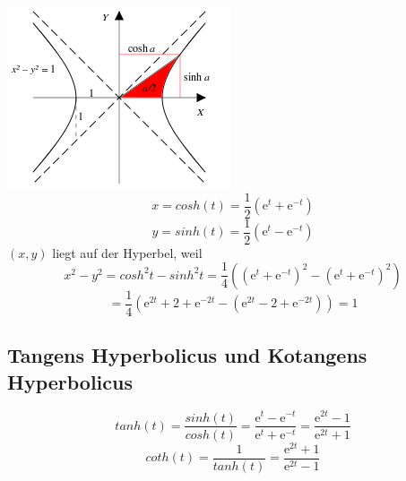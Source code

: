 \documentclass{article}
\begin{document}
\vspace{4ex}

\includegraphics[scale=0.5]{png/cosh.png}
\[ x = cosh(t) = \frac{1}{2}\left(\mathrm{e}^t + \mathrm{e}^{-t}\right) \]
\[ y = sinh(t) = \frac{1}{2}\left(\mathrm{e}^t - \mathrm{e}^{-t}\right) \]
$(x,y)$ liegt auf der Hyperbel, weil
\[ x^2 - y^2 = cosh^2t - sinh^2t = \frac{1}{4} \left(\left(\mathrm{e}^t+\mathrm{e}^{-t}\right)^2 - \left(\mathrm{e}^t+\mathrm{e}^{-t}\right)^2\right) \]
\[ = \frac{1}{4}\left(\mathrm{e}^{2t}+2+\mathrm{e}^{-2t} - \left(\mathrm{e}^{2t}-2+\mathrm{e}^{-2t}\right)\right) = 1 \]

\vspace{5ex}
\subsection{Tangens Hyperbolicus und Kotangens Hyperbolicus\newline}

\[ tanh(t) = \frac{sinh(t)}{cosh(t)} = \frac{\mathrm{e}^t - \mathrm{e}^{-t}}{\mathrm{e}^t + \mathrm{e}^{-t}} = \frac{\mathrm{e}^{2t} - 1}{\mathrm{e}^{2t} + 1} \]
\[ coth(t) = \frac{1}{tanh(t)} = \frac{\mathrm{e}^{2t} + 1}{\mathrm{e}^{2t} - 1} \]
\end{document}

